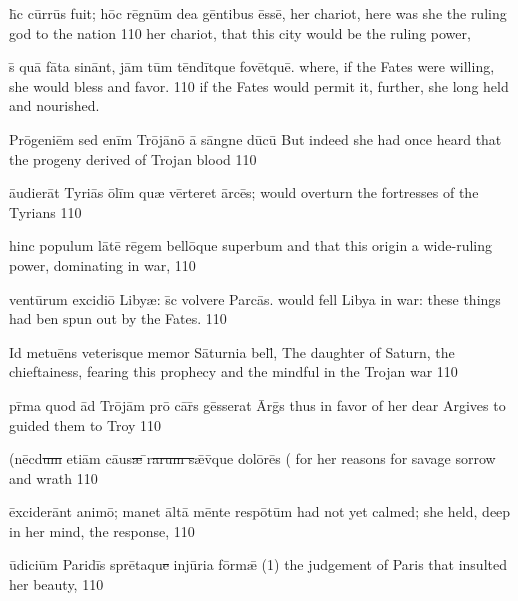 \documentclass[]{article}
\begin{document}
\latline
{h\={\macron{\i}}c c\=urr\=us f\-u\-it; h\=oc r\={\macron e}gn\=um d\-e\-a g\=ent\-ib\-us \=ess\=e,}
{her chariot, here was she the ruling god to the nation}
{110}
{her chariot, that this city would be the ruling power,}
{}

\latline
{s\={\macron{\i}} qu\={\macron a} f\={\macron a}t\-a s\-in\=ant, j\=am t\=um t\=end\=itqu\-e f\-ov\=etqu\=e.}
{where, if the Fates were willing, she would bless and favor.}
{110}
{if the Fates would permit it, further, she long held and nourished.}
{}

\latline
{Pr\={\macron o}g\-en\-i\=em s\-ed \-en\=im Tr\=oj\={\macron a}n\={\macron o} \={\macron a} s\=angne d\={\macron u}c\={\macron u}}
{But indeed she had once heard that the progeny derived of Trojan blood}
{110}
{}
{}

\latline
{\={au}d\-i\-er\=at T\-yr\-i\={\macron a}s \={\macron o}l\=im qu{\ae} v\=ert\-er\-et \=arc\={\macron e}s;}
{would overturn the fortresses of the Tyrians}
{110}
{}
{}

\latline
{hinc populum l\={\macron a}t\={\macron e} r\={\macron e}gem bell\={\macron o}que superbum}
{and that this origin a wide-ruling power, dominating in war,}
{110}
{}
{}

\latline
{vent\={\macron u}rum excidi\={\macron o} Liby{\ae}: s\={\macron{\i}}c volvere Parc\={\macron a}s.}
{would fell Libya in war: these things had ben spun out by the Fates.}
{110}
{}
{}

\latline
{Id metu\={\macron e}ns veterisque memor S\={\macron a}turnia bell\={\macron{\i}},}
{The daughter of Saturn, the chieftainess, fearing this prophecy and the mindful in the Trojan war}
{110}
{}
{}

\latline
{pr\={\macron{\i}}m\-a qu\-od \=ad Tr\=oj\=am pr\={\macron o} c\={\macron a}r\={\macron{\i}}s g\=ess\-er\-at \=Arg\={\macron{\i}}s}
{thus in favor of her dear Argives to guided them to Troy}
{110}
{}
{}

\latline
{(n\=ecd\sout{um }\-et\-i\=am c\={au}s\sout{{{\ae}} }\={\macron{\i}}r\sout{{\macron a}rum s}\={{\ae}}v\={\macron{\i}}qu\-e d\-ol\={\macron o}r\={\macron e}s}
{( for her reasons for savage sorrow and wrath }
{110}
{}
{}

\latline
{\=exc\-id\-er\=ant \-an\-im\={\macron o}; m\-an\-et \=alt\={\macron a} m\=ent\-e r\-esp\=ot\=um }
{had not yet calmed; she held, deep in her mind, the response,}
{110}
{}
{}

\latline
{\={\macron u}d\-ic\-i\=um P\-ar\-id\=is spr\={\macron e}t\-aqu\sout{e }\-inj\={\macron u}r\-i\-a f\=orm\={\ae}}
{(1) the judgement of Paris that insulted her beauty, }
{110}
{}
{}
\end{document}
